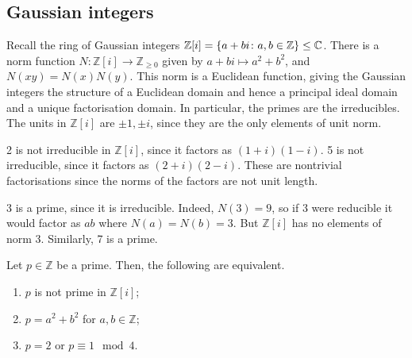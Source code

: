 \subsection{Gaussian integers}
Recall the ring of Gaussian integers \( \mathbb Z[i] = \qty{a+bi \colon a, b \in \mathbb Z} \leq \mathbb C \).
There is a norm function \( N \colon \mathbb Z[i] \to \mathbb Z_{\geq 0} \) given by \( a + bi \mapsto a^2 + b^2 \), and \( N(xy) = N(x) N(y) \).
This norm is a Euclidean function, giving the Gaussian integers the structure of a Euclidean domain and hence a principal ideal domain and a unique factorisation domain.
In particular, the primes are the irreducibles.
The units in \( \mathbb Z[i] \) are \( \pm 1, \pm i \), since they are the only elements of unit norm.
\begin{example}
	2 is not irreducible in \( \mathbb Z[i] \), since it factors as \( (1+i)(1-i) \).
	5 is not irreducible, since it factors as \( (2+i)(2-i) \).
	These are nontrivial factorisations since the norms of the factors are not unit length.

	3 is a prime, since it is irreducible.
	Indeed, \( N(3) = 9 \), so if 3 were reducible it would factor as \( ab \) where \( N(a) = N(b) = 3 \).
	But \( \mathbb Z[i] \) has no elements of norm 3.
	Similarly, 7 is a prime.
\end{example}
\begin{proposition}
	Let \( p \in \mathbb Z \) be a prime.
	Then, the following are equivalent.
	\begin{enumerate}
		\item \( p \) is not prime in \( \mathbb Z[i] \);
		\item \( p = a^2 + b^2 \) for \( a, b \in \mathbb Z \);
		\item \( p = 2 \) or \( p \equiv 1 \mod 4 \).
	\end{enumerate}
\end{proposition}
